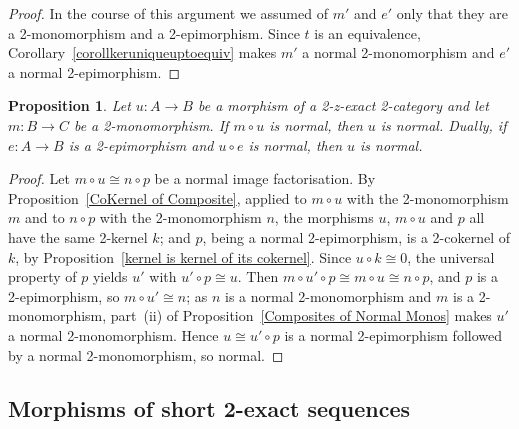 \documentclass[reqno,a4paper]{amsart}
\numberwithin{equation}{section}
\theoremstyle{plain}
\newtheorem{proposition}[subsection]{Proposition}
\theoremstyle{definition}
\def\nameit#1{\textrm{#1}~}
\def\prox{\nameit{Proposition}}
\def\corx{\nameit{Corollary}}
\newcommand{\comp}{\circ}
\newcommand{\iso}{\cong}
\renewcommand{\1}{\onecat{1}}
\begin{document}
\begin{proof}
	In the course of this argument we assumed of \(m'\) and \(e'\) only that they are a 2-monomorphism and a 2-epimorphism. Since \(t\) is an equivalence, \corx\ref{corollkeruniqueuptoequiv} makes \(m'\) a normal 2-monomorphism and \(e'\) a normal 2-epimorphism.
\end{proof}

\begin{proposition}\label{P:NormalCancel}
	Let \(u\colon A\to B\) be a morphism of a 2-z-exact 2-category and let \(m\colon B\to C\) be a 2-monomorphism. If \(m\comp u\) is normal, then \(u\) is normal. Dually, if \(e\colon A\to B\) is a 2-epimorphism and \(u\comp e\) is normal, then \(u\) is normal.
\end{proposition}
\begin{proof}
	Let \(m\comp u\iso n\comp p\) be a normal image factorisation. By \prox\ref{CoKernel of Composite}, applied to \(m\comp u\) with the 2-monomorphism \(m\) and to \(n\comp p\) with the 2-monomorphism \(n\), the morphisms \(u\), \(m\comp u\) and \(p\) all have the same 2-kernel \(k\); and \(p\), being a normal 2-epimorphism, is a 2-cokernel of \(k\), by \prox\ref{kernel is kernel of its cokernel}. Since \(u\comp k\iso 0\), the universal property of \(p\) yields \(u'\) with \(u'\comp p\iso u\). Then \(m\comp u'\comp p\iso m\comp u\iso n\comp p\), and \(p\) is a 2-epimorphism, so \(m\comp u'\iso n\); as \(n\) is a normal 2-monomorphism and \(m\) is a 2-monomorphism, part~\textup{(ii)} of \prox\ref{Composites of Normal Monos} makes \(u'\) a normal 2-monomorphism. Hence \(u\iso u'\comp p\) is a normal 2-epimorphism followed by a normal 2-monomorphism, so normal.
\end{proof}

\subsection{Morphisms of short 2-exact sequences}\label{SS:MorphismSES}
\end{document}

